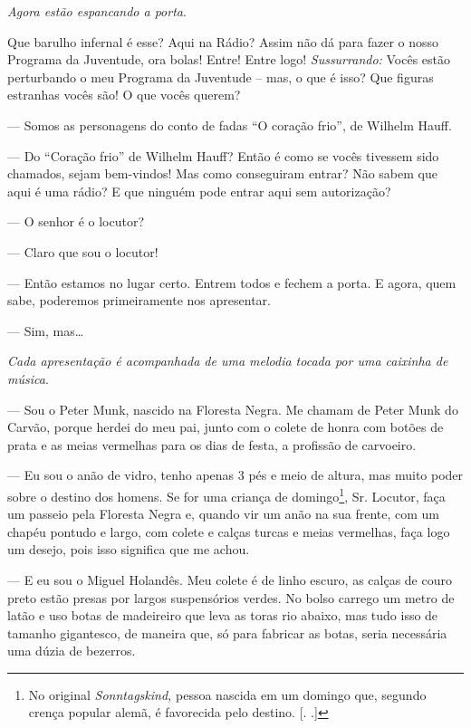 \begin{myparindent}{0pt}
\begin{Parskip}
\emph{Agora estão espancando a porta}.

Que barulho infernal é esse? Aqui na Rádio? Assim não dá para fazer o
nosso Programa da Juventude, ora bolas! Entre! Entre logo!
\emph{Sussurrando:} Vocês estão perturbando o meu Programa da Juventude
-- mas, o que é isso? Que figuras estranhas vocês são! O que vocês
querem?

 --- Somos as personagens do conto de fadas ``O
coração frio'', de Wilhelm Hauff.

 --- Do ``Coração frio'' de Wilhelm Hauff? Então é como se vocês
tivessem sido chamados, sejam bem-vindos! Mas como conseguiram entrar?
Não sabem que aqui é uma rádio? E que ninguém pode entrar aqui sem
autorização?

 --- O senhor é o locutor?

 --- Claro que sou o locutor!

 --- Então estamos no lugar certo. Entrem todos e
fechem a porta. E agora, quem sabe, poderemos primeiramente nos
apresentar.

 --- Sim, mas\ldots{}

\emph{Cada apresentação é acompanhada de uma melodia tocada por uma
caixinha de música}.

 --- Sou o Peter Munk, nascido na Floresta Negra. Me
chamam de Peter Munk do Carvão, porque herdei do meu pai, junto com o
colete de honra com botões de prata e as meias vermelhas para os dias de
festa, a profissão de carvoeiro.

 --- Eu sou o anão de vidro, tenho apenas 3 pés e meio de
altura, mas muito poder sobre o destino dos homens. Se for uma criança
de domingo\footnote{No original \emph{Sonntagskind,} pessoa nascida em
  um domingo que, segundo crença popular alemã, é favorecida pelo
  destino. [. .]}, Sr. Locutor, faça um passeio pela Floresta
Negra e, quando vir um anão na sua frente, com um chapéu pontudo e
largo, com colete e calças turcas e meias vermelhas, faça logo um
desejo, pois isso significa que me achou.

 --- E eu sou o Miguel Holandês. Meu colete é de linho
escuro, as calças de couro preto estão presas por largos suspensórios
verdes. No bolso carrego um metro de latão e uso botas de madeireiro que
leva as toras rio abaixo, mas tudo isso de tamanho gigantesco, de
maneira que, só para fabricar as botas, seria necessária uma dúzia de
bezerros.


\end{Parskip}
\end{myparindent}
